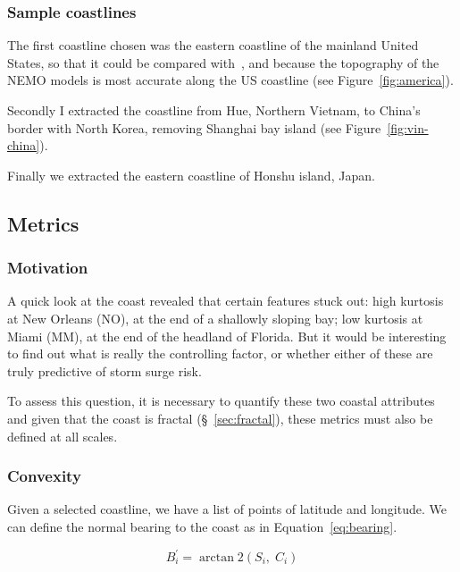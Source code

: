 


\subsubsection{Sample coastlines}
The first coastline chosen was the eastern coastline of the mainland
United States, so that it could be compared with~\cite{ZannaPreprint},
and because the topography of the NEMO models is most accurate along the
US coastline (see Figure~\ref{fig:america}).

Secondly I extracted the coastline from Hue, Northern Vietnam, to China's
border with North Korea, removing Shanghai bay island (see Figure~\ref{fig:vin-china}).

Finally we extracted the eastern coastline of Honshu island, Japan.



\subsection{Metrics}
\subsubsection{Motivation}
A quick look at the coast revealed that certain features stuck out:
high kurtosis at New Orleans (NO), at the end of a shallowly sloping bay;
low kurtosis at Miami (MM), at the end of the headland of Florida.
But it would be interesting to find out what is really the controlling
factor, or whether either of these are truly predictive of storm surge risk.

To assess this question, it is necessary to quantify these two coastal attributes
and given that the coast is fractal (§~\ref{sec:fractal}), these metrics must also be defined at
all scales.

\subsubsection{Convexity}
Given a selected coastline, we have a list of points of latitude and longitude.
We can define the normal bearing to the coast as in Equation~\ref{eq:bearing}.


\begin{equation}
B_i^{\prime}=\operatorname{arctan} 2
\left(S_i,\; C_i\right)
\label{eq:bearing}
\end{equation}

